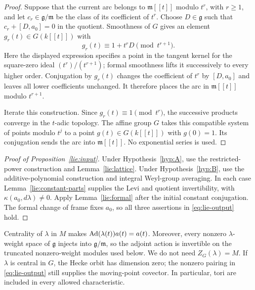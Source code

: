 \begin{proof}
Suppose that the current arc belongs to $\mathfrak m[[t]]$
modulo $t^r$, with $r\ge1$, and let $c_r\in\mathfrak g/\mathfrak m$
be the class of its coefficient of $t^r$.  Choose $D\in\mathfrak g$
such that $c_r+[D,a_0]=0$ in the quotient.
Smoothness of $G$ gives an element $g_r(t)\in G(k[[t]])$ with
\[
 g_r(t)\equiv1+t^rD\pmod {t^{r+1}}.
\]
Here the displayed expression specifies a point in the tangent
kernel for the square-zero ideal $(t^r)/(t^{r+1})$; formal
smoothness lifts it successively to every higher order.
Conjugation by $g_r(t)$ changes the coefficient of $t^r$ by
$[D,a_0]$ and leaves all lower coefficients unchanged.
It therefore places the arc in $\mathfrak m[[t]]$ modulo $t^{r+1}$.

Iterate this construction.  Since $g_r(t)\equiv1\pmod {t^r}$,
the successive products converge in the $t$-adic topology.
The affine group $G$ takes this compatible system of points modulo
$t^j$ to a point $g(t)\in G(k[[t]])$ with $g(0)=1$.
Its conjugation sends the arc into $\mathfrak m[[t]]$.
No exponential series is used.
\end{proof}

\begin{proof}[Proof of Proposition~\ref{lie:input}]
Under Hypothesis~\ref{hyp:A}, use the restricted-power construction
and Lemma~\ref{lie:lattice}.  Under Hypothesis~\ref{hyp:B}, use the
additive-polynomial construction and integral Weyl-group averaging.
In each case Lemma~\ref{lie:constant-parts} supplies the Levi and
quotient invertibility, with
$\kappa(a_0,d\lambda)\ne0$.  Apply Lemma~\ref{lie:formal} after the
initial constant conjugation.  The formal change of frame fixes
$a_0$, so all three assertions in \eqref{eq:lie-output} hold.
\end{proof}

\begin{remark}\label{lie:zero-orbit}
Centrality of $\lambda$ in $M$ makes
$\operatorname{Ad}(\lambda(t))a(t)=a(t)$.  Moreover, every nonzero
$\lambda$-weight space of $\mathfrak g$ injects into
$\mathfrak g/\mathfrak m$, so the adjoint action is invertible on
the truncated nonzero-weight modules used below.
We do not need $Z_G(\lambda)=M$.  If $\lambda$ is central in $G$,
the Hecke orbit has dimension zero; the nonzero pairing in
\eqref{eq:lie-output} still supplies the moving-point covector.
In particular, tori are included in every allowed characteristic.
\end{remark}
